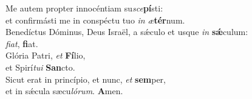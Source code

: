 \oddverse Me autem propter innocéntiam su\textit{sce}\textbf{pí}sti:~\*\\
\oddverse et confirmásti me in conspéctu tuo \textit{in} \textit{æ}\textbf{tér}num.\\
\evenverse Benedíctus Dóminus, Deus Israël, a sǽculo et usque \textit{in} \textbf{sǽ}culum:~\*\\
\evenverse \textit{fi}\textit{at}, \textbf{fi}at.\\
\oddverse Glória Patri, \textit{et} \textbf{Fí}lio,~\*\\
\oddverse et Spirí\textit{tu}\textit{i} \textbf{San}cto.\\
\evenverse Sicut erat in princípio, et nunc, \textit{et} \textbf{sem}per,~\*\\
\evenverse et in sǽcula sæcu\textit{ló}\textit{rum}. \textbf{A}men.\\

